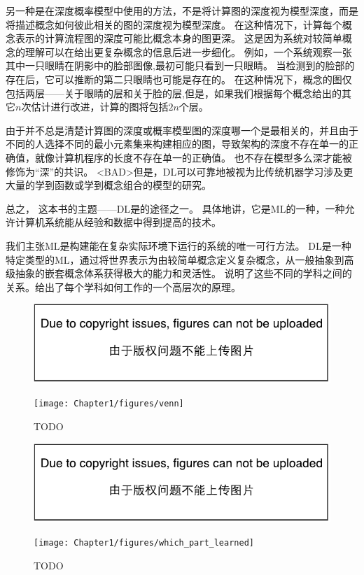 另一种是在深度概率模型中使用的方法，不是将计算图的深度视为模型深度，而是将描述概念如何彼此相关的图的深度视为模型深度。
在这种情况下，计算每个概念表示的计算流程图的深度可能比概念本身的图更深。
这是因为系统对较简单概念的理解可以在给出更复杂概念的信息后进一步细化。
例如，一个系统观察一张其中一只眼睛在阴影中的脸部图像,最初可能只看到一只眼睛。
当检测到的脸部的存在后，它可以推断的第二只眼睛也可能是存在的。
在这种情况下，概念的图仅包括两层——关于眼睛的层和关于脸的层,但是，如果我们根据每个概念给出的其它$n$次估计进行改进，计算的图将包括$2n$个层。


由于并不总是清楚计算图的深度或概率模型图的深度哪一个是最相关的，并且由于不同的人选择不同的最小元素集来构建相应的图，导致架构的深度不存在单一的正确值，就像计算机程序的长度不存在单一的正确值。
也不存在模型多么深才能被修饰为``深''的共识。
<BAD>但是，\gls{DL}可以可靠地被视为比传统机器学习涉及更大量的学到函数或学到概念组合的模型的研究。

总之， 这本书的主题——\gls{DL}是的途径之一。
具体地讲，它是\gls{ML}的一种，一种允许计算机系统能从经验和数据中得到提高的技术。

我们主张\gls{ML}是构建能在复杂实际环境下运行的系统的唯一可行方法。
\gls{DL}是一种特定类型的\gls{ML}，通过将世界表示为由较简单概念定义复杂概念，从一般抽象到高级抽象的嵌套概念体系获得极大的能力和灵活性。
说明了这些不同的学科之间的关系。给出了每个学科如何工作的一个高层次的原理。
\begin{figure}[!hbt]
\ifOpenSource
\centerline{\includegraphics{figure.pdf}}
\else
\centerline{\texttt{[image: Chapter1/figures/venn]}}
\fi
\caption{TODO}
\label{fig:chap1_venn}
\end{figure}
\begin{figure}[!htb]
\ifOpenSource
\centerline{\includegraphics{figure.pdf}}
\else
\centerline{\texttt{[image: Chapter1/figures/which\_part\_learned]}}
\fi
\caption{TODO}
\label{fig:chap1_which_part_learned}
\end{figure}

